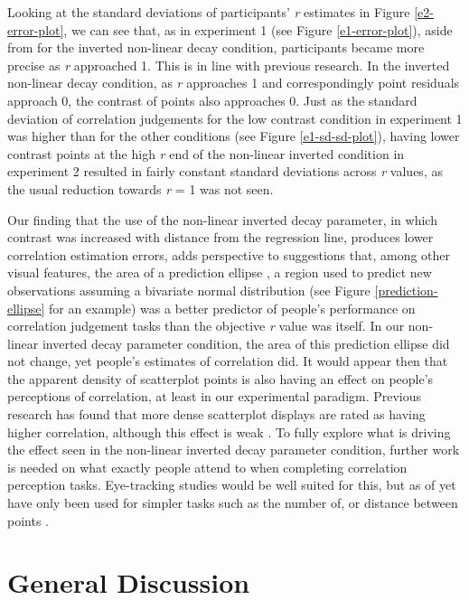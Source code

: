 \documentclass[preprint, 3p,
authoryear]{elsarticle} %
\begin{document}
Looking at the standard deviations of participants' \emph{r} estimates
in Figure \ref{e2-error-plot}, we can see that, as in experiment 1 (see
Figure \ref{e1-error-plot}), aside from for the inverted non-linear
decay condition, participants became more precise as \emph{r} approached
1. This is in line with previous research. In the inverted non-linear
decay condition, as \emph{r} approaches 1 and correspondingly point
residuals approach 0, the contrast of points also approaches 0. Just as
the standard deviation of correlation judgements for the low contrast
condition in experiment 1 was higher than for the other conditions (see
Figure \ref{e1-sd-sd-plot}), having lower contrast points at the high
\emph{r} end of the non-linear inverted condition in experiment 2
resulted in fairly constant standard deviations across \emph{r} values,
as the usual reduction towards \emph{r} = 1 was not seen.

Our finding that the use of the non-linear inverted decay parameter, in
which contrast was increased with distance from the regression line,
produces lower correlation estimation errors, adds perspective to
suggestions \citep{yang_2019} that, among other visual features, the
area of a prediction ellipse \citep{yang_2019, cleveland_1982}, a region
used to predict new observations assuming a bivariate normal
distribution (see Figure \ref{prediction-ellipse} for an example) was a
better predictor of people's performance on correlation judgement tasks
than the objective \emph{r} value was itself. In our non-linear inverted
decay parameter condition, the area of this prediction ellipse did not
change, yet people's estimates of correlation did. It would appear then
that the apparent density of scatterplot points is also having an effect
on people's perceptions of correlation, at least in our experimental
paradigm. Previous research has found that more dense scatterplot
displays are rated as having higher correlation, although this effect is
weak \citep{lauer_1989, rensink_2014}. To fully explore what is driving
the effect seen in the non-linear inverted decay parameter condition,
further work is needed on what exactly people attend to when completing
correlation perception tasks. Eye-tracking studies would be well suited
for this, but as of yet have only been used for simpler tasks such as
the number of, or distance between points \citep{netzel_2017}.

\hypertarget{general-discussion}{%
\section{General Discussion}\label{general-discussion}}
\end{document}
